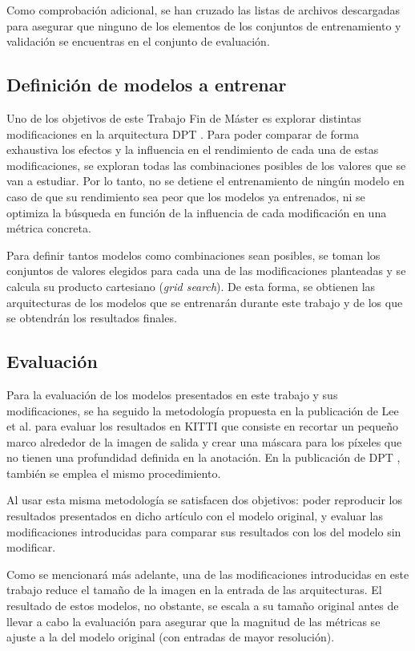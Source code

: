 Como comprobación adicional, se han cruzado las listas de archivos descargadas para asegurar que ninguno de los elementos de los conjuntos de entrenamiento y validación se encuentras en el conjunto de evaluación.


\subsection{Definición de modelos a entrenar}
Uno de los objetivos de este Trabajo Fin de Máster es explorar distintas modificaciones en la arquitectura DPT \cite{visiontransformersDPT}. Para poder comparar de forma exhaustiva los efectos y la influencia en el rendimiento de cada una de estas modificaciones, se exploran todas las combinaciones posibles de los valores que se van a estudiar. Por lo tanto, no se detiene el entrenamiento de ningún modelo en caso de que su rendimiento sea peor que los modelos ya entrenados, ni se optimiza la búsqueda en función de la influencia de cada modificación en una métrica concreta.

Para definir tantos modelos como combinaciones sean posibles, se toman los conjuntos de valores elegidos para cada una de las modificaciones planteadas y se calcula su producto cartesiano (\textit{grid search}). De esta forma, se obtienen las arquitecturas de los modelos que se entrenarán durante este trabajo y de los que se obtendrán los resultados finales.


\subsection{Evaluación}
Para la evaluación de los modelos presentados en este trabajo y sus modificaciones, se ha seguido la metodología propuesta en la publicación de Lee et al. \cite{bts} para evaluar los resultados en KITTI que consiste en recortar un pequeño marco alrededor de la imagen de salida y crear una máscara para los píxeles que no tienen una profundidad definida en la anotación. En la publicación de DPT \cite{visiontransformersDPT}, también se emplea el mismo procedimiento.

Al usar esta misma metodología se satisfacen dos objetivos: poder reproducir los resultados presentados en dicho artículo con el modelo original, y evaluar las modificaciones introducidas para comparar sus resultados con los del modelo sin modificar. 

Como se mencionará más adelante, una de las modificaciones introducidas en este trabajo reduce el tamaño de la imagen en la entrada de las arquitecturas. El resultado de estos modelos, no obstante, se escala a su tamaño original antes de llevar a cabo la evaluación para asegurar que la magnitud de las métricas se ajuste a la del modelo original (con entradas de mayor resolución).

